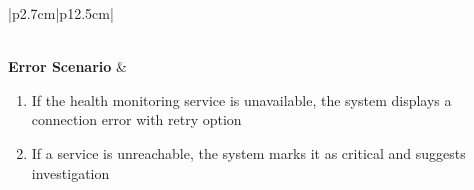\begin{table}[H]
\begin{tabular}{|p{2.7cm}|p{12.5cm}|}
\begin{minipage}[t]{\linewidth}
                                  \end{minipage}                                            \\
        \hline
        \textbf{Error Scenario} & \begin{minipage}[t]{\linewidth}
                                      \begin{enumerate}[topsep=0pt,itemsep=1pt,parsep=0pt,partopsep=0pt]
                                          \item If the health monitoring service is unavailable, the system displays a
                                                connection error with retry option
                                          \item If a service is unreachable, the system marks it as critical and suggests
                                                investigation
                                      \end{enumerate}
                                  \end{minipage}                                               \\
        \hline
    \end{tabular}
    \label{tab:admin-platform-health}
\end{table}
